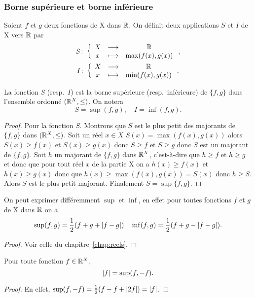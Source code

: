 \subsubsection{Borne supérieure et borne inférieure}
\begin{defdef}
  Soient $f$ et $g$ deux fonctions de X dans $\mathbb{R}$. On définit deux applications $S$ et $I$ de X vers $\mathbb{R}$ par
  \begin{gather}
    S\colon \left\{\begin{array}{ccc} X & \longrightarrow &\mathbb{R}\\ x & \longmapsto & \max(f(x),g(x)) \end{array} \right.,\\
    I\colon \left\{\begin{array}{ccc} X & \longrightarrow &\mathbb{R}\\ x & \longmapsto & \min(f(x),g(x)) \end{array} \right..
  \end{gather}
\end{defdef}

\begin{prop}
  La fonction $S$ (resp.\ $I$) est la borne supérieure (resp.\ inférieure) de $\{f,g\}$ dans l'ensemble ordonné $(\mathbb{R}^X, \leq)$. On notera
  \begin{equation}
    S=\sup(f,g), \quad I=\inf(f,g).
  \end{equation}
\end{prop}
\begin{proof}
Pour la fonction $S$. Montrons que $S$ est le plus petit des majorants de $\{f,g\}$ dans $(\mathbb{R}^X, \leq)$. Soit un réel $x \in X$ $S(x)=\max(f(x),g(x))$ alors $S(x) \geq f(x)$ et $S(x) \geq g(x)$ donc $S \geq f$ et $S \geq g$ donc $S$ est un majorant de $\{f,g\}$. Soit $h$ un majorant de $\{f,g\}$ dans $\mathbb{R}^X$, c'est-à-dire que $h \geq f$ et $h \geq g$ et donc que pour tout réel $x$ de la partie X on a $h(x) \geq f(x)$ et $h(x) \geq g(x)$ donc que $h(x) \geq \max(f(x),g(x))=S(x)$ donc $h \geq S$. Alors $S$ est le plus petit majorant. Finalement $S=\sup\{f,g\}$.
\end{proof}
\begin{prop}
  On peut exprimer différemment $\sup$ et $\inf$, en effet pour toutes fonctions $f$ et $g$ de X dans $\mathbb{R}$ on a
  \begin{equation}
    \sup(f,g)=\frac{1}{2}(f+g+\left\lvert f-g\right\rvert) \quad \inf(f,g)=\frac{1}{2}(f+g-\left\lvert f-g\right\rvert).
  \end{equation}
\end{prop}
\begin{proof}
  Voir celle du chapitre~\ref{chap:reels}.
\end{proof}
\begin{cor}
  Pour toute fonction $f \in \mathbb{R}^X$,
  \begin{equation}
    \left\lvert f\right\rvert=\sup(f,-f).
  \end{equation}
\end{cor}
\begin{proof}
  En effet, $\sup(f,-f)=\frac{1}{2}(f-f+\left\lvert2f\right\rvert)=\left\lvert f\right\rvert$.
\end{proof}

